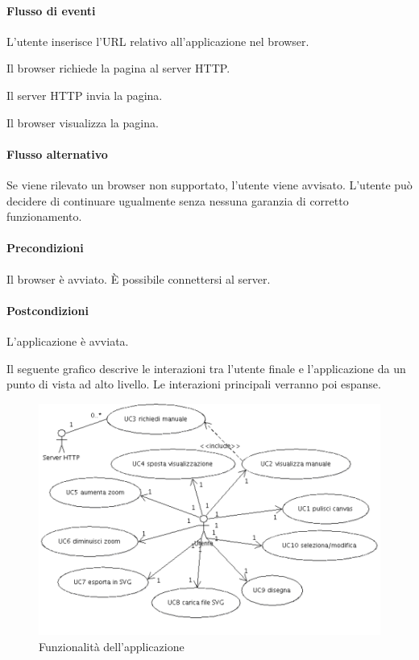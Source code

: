 \paragraph{Flusso di eventi}
\begin{elenconumerato}[\textbf{}]{\subsubsecindent}
\item L'utente inserisce l'URL relativo all'applicazione nel browser.
\item Il browser richiede la pagina al server HTTP.
\item Il server HTTP invia la pagina.
\item Il browser visualizza la pagina.
\end{elenconumerato}
\paragraph{Flusso alternativo}
Se viene rilevato un browser non supportato, l'utente viene avvisato. L'utente pu\`o decidere di continuare ugualmente senza nessuna garanzia di corretto funzionamento.
\paragraph{Precondizioni} Il browser \`e avviato. \`E possibile connettersi al server.
\paragraph{Postcondizioni} L'applicazione \`e avviata.

Il seguente grafico descrive le interazioni tra l'utente finale e l'applicazione da un punto di vista ad alto livello. Le interazioni principali verranno poi espanse.
\begin{figure}[!ht]
\centering
\vspace{20pt} 
\includegraphics{UCInterazione.png}
\caption{Funzionalit\`a dell'applicazione}
\end{figure}

